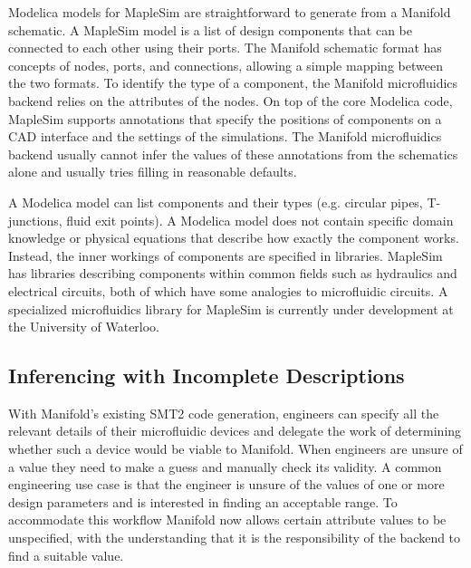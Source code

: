Modelica models for MapleSim are straightforward to generate from a Manifold schematic.
A MapleSim model is a list of design components that can be connected to each other using their ports.
The Manifold schematic format has concepts of nodes, ports, and connections, allowing a simple mapping between the two formats.
To identify the type of a component, the Manifold microfluidics backend relies on the attributes of the nodes.
On top of the core Modelica code, MapleSim supports annotations that specify the positions of components on a CAD interface and the settings of the simulations.
The Manifold microfluidics backend usually cannot infer the values of these annotations from the schematics alone and usually tries filling in reasonable defaults.

A Modelica model can list components and their types (e.g. circular pipes, T-junctions, fluid exit points).
A Modelica model does not contain specific domain knowledge or physical equations that describe how exactly the component works.
Instead, the inner workings of components are specified in libraries.
MapleSim has libraries describing components within common fields such as hydraulics and electrical circuits, both of which have some analogies to microfluidic circuits.
A specialized microfluidics library for MapleSim is currently under development at the University of Waterloo.

\subsection{Inferencing with Incomplete Descriptions}

With Manifold's existing SMT2 code generation, engineers can specify all the
relevant details of their microfluidic devices and delegate the work of
determining whether such a device would be viable to Manifold. When engineers
are unsure of a value they need to make a guess and manually check its
validity. A common engineering use case is that the engineer is unsure of the
values of one or more design parameters and is interested in finding an
acceptable range. To accommodate this workflow Manifold now allows certain
attribute values to be unspecified, with the understanding that it is the
responsibility of the backend to find a suitable value.

